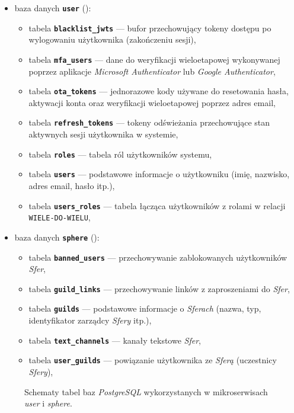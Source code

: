 \begin{itemize}
  \item baza danych \textbf{\texttt{user}} ():
        \begin{itemize}
          \item tabela \textbf{\texttt{blacklist\_jwts}} — bufor przechowujący tokeny dostępu po wylogowaniu użytkownika
                (zakończeniu sesji),
          \item	tabela \textbf{\texttt{mfa\_users}} — dane do weryfikacji wieloetapowej wykonywanej poprzez aplikacje
                \textit{Microsoft Authenticator} lub \textit{Google Authenticator},
          \item tabela \textbf{\texttt{ota\_tokens}} — jednorazowe kody używane do resetowania hasła, aktywacji konta
                oraz weryfikacji wieloetapowej poprzez adres email,
          \item tabela \textbf{\texttt{refresh\_tokens}} — tokeny odświeżania przechowujące stan aktywnych sesji
                użytkownika w systemie,
          \item tabela \textbf{\texttt{roles}} — tabela ról użytkowników systemu,
          \item tabela \textbf{\texttt{users}} — podstawowe informacje o użytkowniku (imię, nazwisko, adres email, hasło
                itp.),
          \item tabela \textbf{\texttt{users\_roles}} — tabela łącząca użytkowników z rolami w relacji
                \texttt{WIELE-DO-WIELU},
        \end{itemize}
  \item baza danych \textbf{\texttt{sphere}} ():
        \begin{itemize}
          \item tabela \textbf{\texttt{banned\_users}} — przechowywanie zablokowanych użytkowników \textit{Sfer},
          \item tabela \textbf{\texttt{guild\_links}} — przechowywanie linków z zaproszeniami do \textit{Sfer},
          \item tabela \textbf{\texttt{guilds}} — podstawowe informacje o \textit{Sferach} (nazwa, typ, identyfikator
                zarządcy \textit{Sfery} itp.),
          \item tabela \textbf{\texttt{text\_channels}} — kanały tekstowe \textit{Sfer},
          \item tabela \textbf{\texttt{user\_guilds}} — powiązanie użytkownika ze \textit{Sferą} (uczestnicy
                \textit{Sfery}),
        \end{itemize}
\end{itemize}
%
\begin{figure}[H]
  \centering
  \caption{Schematy tabel baz \textit{PostgreSQL} wykorzystanych w mikroserwisach \textit{user} i \textit{sphere}.}
  \label{fig:pgsql-first-model}
\end{figure}

